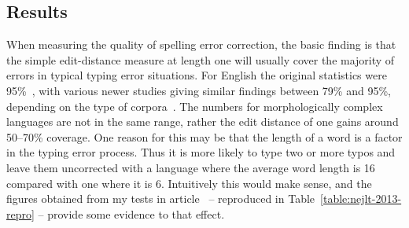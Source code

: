 \documentclass[officiallayout,final]{unihelcompling}
\begin{document}
\subsection{Results}

When measuring the quality of spelling error correction, the basic finding is
that the simple edit-distance measure at length one will usually cover the
majority of errors in typical typing error situations. For English the original
statistics were 95\%~\citep{damerau1964technique}, with various newer studies
giving similar findings between 79\% and 95\%, depending on the type of
corpora~\citep{kukich1992spelling}.  The numbers for morphologically complex
languages are not in the same range, rather the edit distance of one gains
around 50--70\% coverage. One reason for this may be that the length of a word
is a factor in the typing error process. Thus it is more likely to type two or
more typos and leave them uncorrected with a language where the average word
length is 16 compared with one where it is 6. Intuitively this would make
sense, and the figures obtained from my tests in
article~ -- reproduced in
Table~\ref{table:nejlt-2013-repro} -- provide some evidence to that effect.
\end{document}
